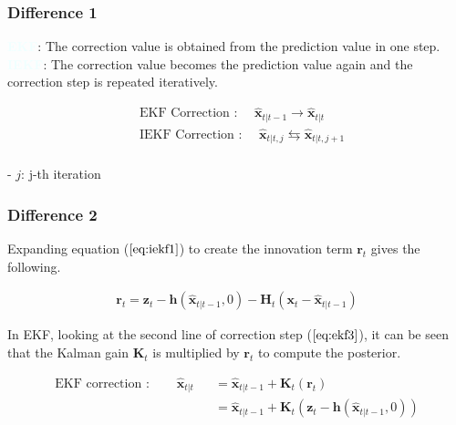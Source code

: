 \documentclass[10pt]{article}
\newcommand{\textbfazure}[1]{\textcolor{azure}{\textbf{#1}}}
\begin{document}
	\subsubsection{Difference 1}
	\textbfazure{EKF}: The correction value is obtained from the prediction value in one step. \\
	\textbfazure{IEKF}: The correction value becomes the prediction value again and the correction step is repeated iteratively.
	
	\begin{equation}
		\boxed{ \begin{aligned}
				& \text{EKF Correction : } \quad \hat{\mathbf{x}}_{t|t-1} \rightarrow \hat{\mathbf{x}}_{t|t} \\
				& \text{IEKF Correction : } \quad \hat{\mathbf{x}}_{t|t,j} \leftrightarrows \hat{\mathbf{x}}_{t|t,j+1} \\
		\end{aligned} }
	\end{equation}
	
	- $j$: j-th iteration
	
	
	
	\subsubsection{Difference 2}
	Expanding equation ($\ref{eq:iekf1}$) to create the innovation term $\mathbf{r}_{t}$ gives the following.
	
	\begin{equation} 
		\begin{aligned}
			\mathbf{r}_{t} = \mathbf{z}_{t} - \mathbf{h} (\hat{\mathbf{x}}_{t|t-1}, 0) - \mathbf{H}_{t}(\mathbf{x}_{t} -\hat{\mathbf{x}}_{t|t-1}) 
		\end{aligned} 
	\end{equation}
	
	
	In EKF, looking at the second line of correction step ($\ref{eq:ekf3}$), it can be seen that the Kalman gain $\mathbf{K}_{t}$ is multiplied by $\mathbf{r}_{t}$ to compute the posterior.
	
	\begin{equation}
		\begin{aligned}
			\text{EKF correction : } \quad & \hat{\mathbf{x}}_{t|t}  && = \hat{\mathbf{x}}_{t|t-1} + \mathbf{K}_{t}( \mathbf{r}_{t}) \\
			& &&  = \hat{\mathbf{x}}_{t|t-1} + \mathbf{K}_{t}( \mathbf{z}_{t} - \mathbf{h}(\hat{\mathbf{x}}_{t|t-1}, 0))
		\end{aligned} 
	\end{equation}
	
\end{document}
